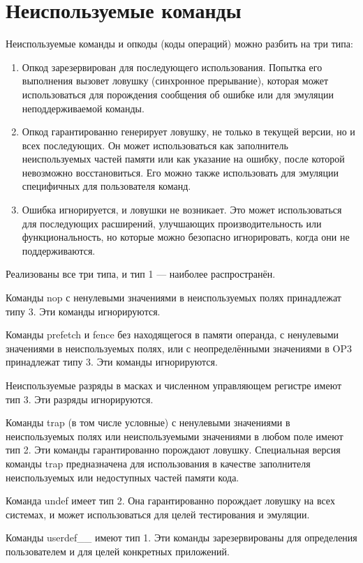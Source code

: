 \documentclass[forwardcom.tex]{subfiles}
\begin{document}
\section{Неиспользуемые команды} \label{unusedInstructions}
Неиспользуемые команды и опкоды (коды операций) можно разбить на три типа:
\begin{enumerate}
	\item Опкод зарезервирован для последующего использования. Попытка его выполнения вызовет ловушку (синхронное прерывание), которая может использоваться для порождения сообщения об ошибке или для эмуляции неподдерживаемой команды.
	\item Опкод гарантированно генерирует ловушку, не только в текущей версии, но и всех последующих. Он может использоваться как заполнитель неиспользуемых частей памяти или как указание на ошибку, после которой невозможно восстановиться. Его можно также использовать для эмуляции специфичных для пользователя команд.
	\item Ошибка игнорируется, и ловушки не возникает. Это может использоваться для последующих расширений, улучшающих производительность или функциональность, но которые можно безопасно игнорировать, когда они не поддерживаются.
\end{enumerate}

Реализованы все три типа, и тип 1 --- наиболее распространён.

Команды nop с ненулевыми значениями в неиспользуемых полях принадлежат типу 3. Эти команды игнорируются.

Команды prefetch и fence без находящегося в памяти операнда, с ненулевыми значениями в неиспользуемых полях, или с неопределёнными значениями в OP3 принадлежат типу 3. Эти команды игнорируются.

Неиспользуемые разряды в масках и численном управляющем регистре имеют тип 3. Эти разряды игнорируются.

Команды trap (в том числе условные) с ненулевыми значениями в неиспользуемых полях или неиспользуемыми значениями в любом поле имеют тип 2. Эти команды гарантированно порождают ловушку. Специальная версия команды trap предназначена для использования в качестве заполнителя неиспользуемых или недоступных частей памяти кода.

Команда undef имеет тип 2. Она гарантированно порождает ловушку на всех системах, и может использоваться для целей тестирования и эмуляции.


Команды userdef\_\_ имеют тип 1. Эти команды зарезервированы для определения пользователем и для целей конкретных приложений.
\end{document}
